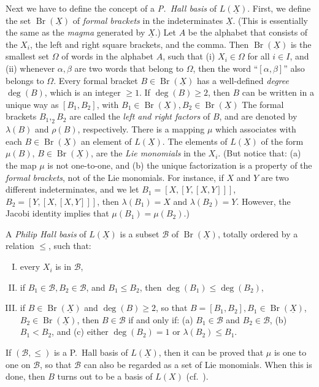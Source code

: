 \documentclass[leqno]{article}
\theoremstyle{plain}
\newcommand{\Br}{\operatorname{Br}(\underline{X})}
\begin{document}
Next we have to define the concept of a \emph{P.\ Hall basis} of $L(\underline{X})$. First, we define the set $\Br$ of \emph{formal brackets} in the indeterminates $\underline{X}$. (This is essentially the same as the \emph{magma} generated by $\underline{X}$.)
Let $A$ be the alphabet that consists of the $X_{i}$, the left and right square brackets, and the comma. Then $\Br$ is the smallest set $\Omega$ of words in the alphabet $A$, such that (i) $X_{i} \in \Omega$ for all $i \in I$, and (ii) whenever $\alpha, \beta$ are two words that belong to $\Omega$, then the word ``$[\alpha,\beta]$'' also belongs to $\Omega$.
Every formal bracket $B \in \Br$ has a well-defined \emph{degree} $\operatorname{deg}(B)$, which is an integer $\geq 1$. 
If $\operatorname{deg}(B) \geq 2$, then $B$ can be written in a unique way as $\left[B_{1}, B_{2}\right]$, with $B_{1} \in \Br, B_{2} \in \Br$
The formal brackets $B_{1},_{2} B_{2}$ are called the \emph{left and right factors} of $B$, and are denoted by $\lambda(B)$ and $\rho(B)$, respectively. 
There is a mapping $\mu$ which associates with each $B \in \Br$ an element of $L(\underline{X})$. 
The elements of $L(\underline{X})$ of the form $\mu(B)$, $B \in \Br$, are the \emph{Lie monomials} in the $X_{i}$. (But notice that: (a) the map $\mu$ is not one-to-one, and (b) the unique factorization is a property of the \emph{formal brackets}, not of the Lie monomials. 
For instance, if $X$ and $Y$ are two different indeterminates, and we let $B_{1}=[X,[Y,[X, Y]]]$, $B_{2}=[Y,[X,[X, Y]]]$, then $\lambda\left(B_{1}\right)=X$ and $\lambda\left(B_{2}\right)=Y$. 
However, the Jacobi identity implies that $\mu\left(B_1\right)=\mu\left(B_{2}\right)$.)

A \emph{Philip Hall basis} of $L(\underline{X})$ is a subset $\mathcal{B}$ of $\Br$, totally ordered by a relation $\leq$, such that:
\begin{enumerate}[(I)]
	\item every $X_{i}$ is in $\mathcal{B}$,
	\item if $B_{1} \in \mathcal{B}, B_{2} \in \mathcal{B}$, and $B_{1} \leq B_{2}$, then $\operatorname{deg}\left(B_{1}\right) \leq \operatorname{deg}\left(B_{2}\right)$,
	\item if $B \in \Br$ and $\operatorname{deg}(B) \geq 2$, so that $B=\left[B_{1}, B_{2}\right], B_{1} \in \Br$, $B_{2} \in \Br$, then $B \in \mathcal{B}$ if and only if: (a) $B_{1} \in \mathcal{B}$ and $B_{2} \in \mathcal{B}$, (b) $B_{1} < B_{2}$, and (c)	 either $\operatorname{deg}\left(B_{2}\right)=1$ or $\lambda\left(B_{2}\right) \leq B_{1}$.
\end{enumerate}
If $(\mathcal{B}, \leq)$ is a P.\ Hall basis of $L(\underline{X})$, then it can be proved that $\mu$ is one to one on $\mathcal{B}$, so that $\mathcal{B}$ can also be regarded as a set of Lie monomials.
When this is done, then $B$ turns out to be a basis of $L(X)$ (cf.\ \cite{1,2,3}). 
\end{document}
